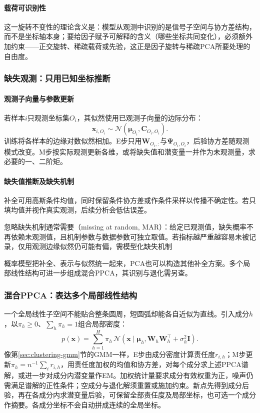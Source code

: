 \paragraph{载荷可识别性}

这一旋转不变性的理论含义是：模型从观测中识别的是信号子空间与协方差结构，而不是坐标轴本身；要给因子赋予可解释的含义（哪些坐标共同变化），必须额外加约束——正交旋转、稀疏载荷或先验，这正是因子旋转与稀疏PCA所要处理的自由度。

\subsubsection{缺失观测：只用已知坐标推断}

\paragraph{观测子向量与参数更新}

若样本$i$只观测坐标集$O_i$，其似然使用已观测子向量的边际分布：
\begin{equation}
\label{eq:dim-linear-missing}
\bm{x}_{i,O_i}\sim
\mathcal{N}(\bm{\mu}_{O_i},\bm{C}_{O_i,O_i}).
\end{equation}
训练将各样本的边缘对数似然相加。E步只用$\bm{W}_{O_i,:}$与$\bm{\Psi}_{O_i,O_i}$，后验协方差随观测模式改变。M步按实际观测更新各维，或将缺失值和潜变量一并作为未观测量，求必要的一、二阶矩。

\paragraph{缺失值推断及缺失机制}

补全可用高斯条件均值，同时保留条件协方差或作条件采样以传播不确定性。若只填均值并视作真实观测，后续分析会低估误差。

忽略缺失机制通常需要（missing at random, MAR）：给定已观测值，缺失概率不再依赖未观测值，且机制参数与数据参数可独立取值。若指标越严重越容易未被记录，仅用观测边缘似然仍可能有偏，需模型化缺失机制

概率模型把补全、表示与似然统一起来，PCA也可以构造其他补全方案。多个局部线性结构可进一步组成混合PPCA，其识别与退化需另查。

\subsubsection{混合PPCA：表达多个局部线性结构}

一个全局线性子空间不能贴合整条圆周，短圆弧却能各自近似为直线。引入成分$h$，以$\pi_h\geq0$、$\sum_h\pi_h=1$组合局部密度：
\[
 p(\bm x)=\sum_{h=1}^H\pi_h\,
 \mathcal N(\bm x\mid\bm\mu_h,
                \bm W_h\bm W_h^\top+\sigma_h^2\bm I).
\]
像第\ref{sec:clustering-gmm}节的GMM一样，E步由成分密度计算责任度$r_{i,h}$；M步更新$\pi_h=n^{-1}\sum_i r_{i,h}$，用责任度加权的均值和协方差，对每个成分求上述PPCA谱解，或进一步对成分内潜变量作EM。加权统计量要求成分有效权重为正，噪声仍需满足谱解的正性条件；空成分与退化解须重置或施加约束。新点先得到成分后验，再在各成分内求潜变量后验，可保留全部责任度及局部坐标，也可选一个成分作摘要。各成分坐标不会自动拼成连续的全局坐标。

